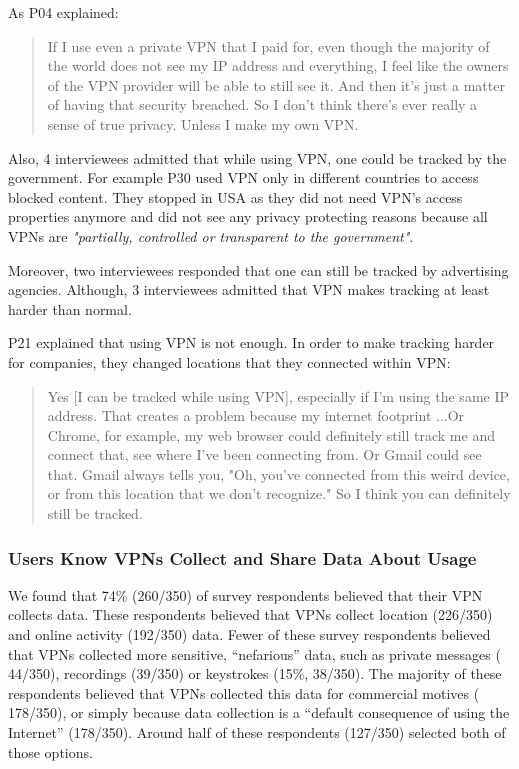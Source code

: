 As P04 explained: \begin{quote}If I use even a private VPN that I paid for, even
though the majority of the world does not see my IP address and everything, I
feel like the owners of the VPN provider will be able to still see it. And
then it's just a matter of having that security breached. So I don't think
there's ever really a sense of true privacy. Unless I make my own
VPN.\end{quote}



Also, 4 interviewees admitted that while using VPN, one could be tracked by
the government. For example P30 used VPN only in different countries to access
blocked content. They stopped in USA as they did not need VPN's access
properties anymore and did not see any privacy protecting reasons because all VPNs are \textit{"partially, controlled
or transparent to the government"}.

Moreover, two interviewees responded that one can still be tracked by
 advertising agencies. Although, 3 interviewees admitted that VPN makes
 tracking at least harder than normal. 

P21 explained that using VPN is not enough. In order to make tracking harder
for companies, they changed locations that they connected within VPN:
\begin{quote}Yes [I can be tracked while using VPN], especially if I'm using
the same IP address. That creates a problem because my internet footprint ...Or Chrome, for example, my web browser could definitely still track me
and connect that, see where I've been connecting from. Or Gmail could see
that. Gmail always tells you, "Oh, you've connected from this weird device, or
from this location that we don't recognize." So I think you can definitely
still be tracked.\end{quote}

\subsubsection{Users Know VPNs Collect and Share Data About Usage}

We found that 74\% (260/350) of survey respondents believed that their VPN
collects data. These respondents believed that VPNs collect
location (226/350) and online activity (192/350) data. Fewer of these survey
respondents believed that VPNs collected more sensitive, “nefarious” data,
such as private messages ( 44/350), recordings (39/350) or
keystrokes (15\%, 38/350). The majority of these respondents believed that
VPNs collected this data for commercial motives ( 178/350), or simply
because data collection is a “default consequence of using the Internet”
(178/350). Around half of these respondents (127/350) selected
both of those options.

